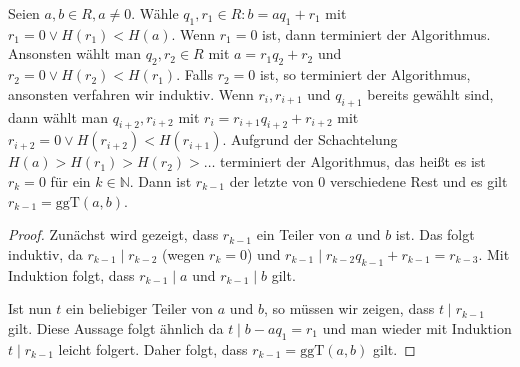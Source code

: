 \begin{theorem}\label{theorem:euklidischer-algorithmus}
    Seien $a,b\in R, a\neq 0$. Wähle $q_1,r_1\in R:b=aq_1+r_1$ mit $r_1=0\lor H(r_1)<H(a)$. Wenn $r_1=0$ ist, dann terminiert der Algorithmus. Ansonsten wählt man $q_2,r_2\in R$ mit
    $a=r_1q_2+r_2$ und $r_2=0\lor H(r_2)<H(r_1)$. Falls $r_2=0$ ist, so terminiert der Algorithmus, ansonsten verfahren wir induktiv. Wenn $r_i, r_{i+1}$ und $q_{i+1}$ bereits gewählt sind, dann wählt man $q_{i+2},r_{i+2}$ mit $r_i=r_{i+1}q_{i+2}+r_{i+2}$ mit $r_{i+2}=0\lor H(r_{i+2})<H(r_{i+1})$. Aufgrund der Schachtelung $H(a)>H(r_1)>H(r_2)>\ldots$ terminiert der Algorithmus, das heißt es ist $r_k=0$ für ein $k\in\mathbb{N}$. Dann ist $r_{k-1}$ der letzte von $0$ verschiedene Rest und es gilt $r_{k-1}=\mathrm{ggT}(a,b)$.
\end{theorem}

\begin{proof}
    Zunächst wird gezeigt, dass $r_{k-1}$ ein Teiler von $a$ und $b$ ist. Das folgt induktiv,
    da $r_{k-1}\mid r_{k-2}$ (wegen $r_k=0$) und $r_{k-1}\mid r_{k-2}q_{k-1}+r_{k-1}=r_{k-3}$.
    Mit Induktion folgt, dass $r_{k-1}\mid a$ und $r_{k-1}\mid b$ gilt.

    Ist nun $t$ ein beliebiger Teiler von $a$ und $b$, so müssen wir zeigen, dass $t\mid r_{k-1}$ gilt.
    Diese Aussage folgt ähnlich da $t\mid b-aq_1=r_1$ und man wieder mit Induktion $t\mid r_{k-1}$ leicht folgert.
    Daher folgt, dass $r_{k-1}=\mathrm{ggT}(a,b)$ gilt. 
\end{proof}

